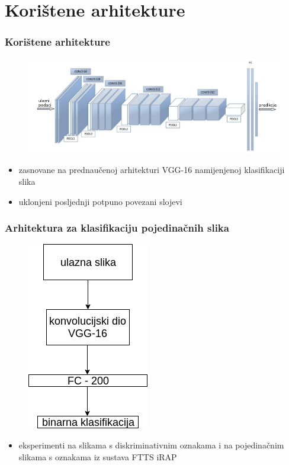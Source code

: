 \documentclass{beamer}
\begin{document}
\section{Korištene arhitekture}
\begin{frame}
\frametitle{Korištene arhitekture}
 \begin{figure}[H]
\centering
\includegraphics[scale=0.5]{images/vgg_architecture.png}
\end{figure} 
\begin{itemize}
 \item zasnovane na prednaučenoj arhitekturi VGG-16 namijenjenoj klasifikaciji slika 
 \item uklonjeni posljednji potpuno povezani slojevi
\end{itemize}
\end{frame}

\begin{frame}
\frametitle{Arhitektura za klasifikaciju pojedinačnih slika}
 \begin{figure}[H]
\centering
\includegraphics[scale=0.5]{images/single_image_architecture.png}
\end{figure} 
 \begin{itemize}
  \item eksperimenti na slikama s diskriminativnim oznakama i na pojedinačnim slikama s oznakama iz sustava FTTS iRAP
 \end{itemize}

\end{frame}
\end{document}

